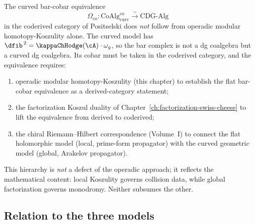 \begin{remark}
\label{rem:curved-non-corollary}
The curved bar-cobar equivalence
\[
 \Omega_{\mathrm{co}} \colon
 \mathrm{CoAlg}^{\mathrm{co}}_{\mathrm{curv}}
 \xrightarrow{\;\sim\;}
 \mathrm{CDG}\text{-}\mathrm{Alg}
\]
in the coderived category of Positselski does \emph{not} follow
from operadic modular homotopy-Koszulity alone. The curved model
has $\dfib^{\,2} = \kappaChHodge(\cA) \cdot \omega_g$, so the bar complex
is not a dg coalgebra but a curved dg coalgebra. Its cobar must be
taken in the coderived category, and the equivalence requires:
\begin{enumerate}[label=\textup{(\arabic*)}]
\item operadic modular homotopy-Koszulity (this chapter) to
 establish the flat bar-cobar equivalence as a derived-category
 statement;
\item the factorization Koszul duality of
 Chapter~\ref{ch:factorization-swiss-cheese} to lift the
 equivalence from derived to coderived;
\item the chiral Riemann--Hilbert correspondence (Volume~I) to
 connect the flat holomorphic model (local, prime-form propagator)
 with the curved geometric model (global, Arakelov propagator).
\end{enumerate}
This hierarchy is \emph{not} a defect of the operadic approach;
it reflects the mathematical content: local Koszulity
governs collision data, while global factorization governs
monodromy. Neither subsumes the other.
\end{remark}


\subsection{Relation to the three models}
\label{subsec:three-models-relation}

